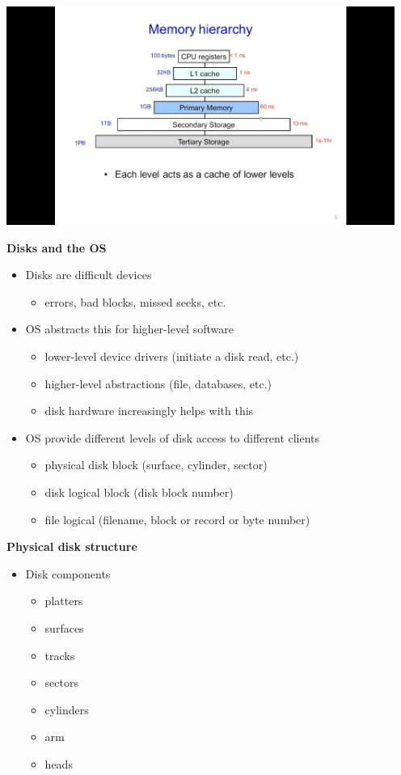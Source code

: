 \documentclass[11pt,a4paper]{article}
\begin{document}
\includegraphics[height=270]{memory-hierarchy.jpg}

\textbf{Disks and the OS}
\begin{itemize}
    \item Disks are difficult devices
        \begin{itemize}
            \item errors, bad blocks, missed seeks, etc.
        \end{itemize}
    \item OS abstracts this for higher-level software
        \begin{itemize}
            \item lower-level device drivers (initiate a disk read, etc.)
            \item higher-level abstractions (file, databases, etc.)
            \item disk hardware increasingly helps with this
        \end{itemize}
    \item OS provide different levels of disk access to different clients
        \begin{itemize}
            \item physical disk block (surface, cylinder, sector)
            \item disk logical block (disk block number)
            \item file logical (filename, block or record or byte number)
        \end{itemize}
\end{itemize}

\textbf{Physical disk structure}
\begin{itemize}
    \item Disk components
        \begin{itemize}
            \item platters
            \item surfaces
            \item tracks
            \item sectors
            \item cylinders
            \item arm
            \item heads
        \end{itemize}
\end{itemize}
\end{document}
